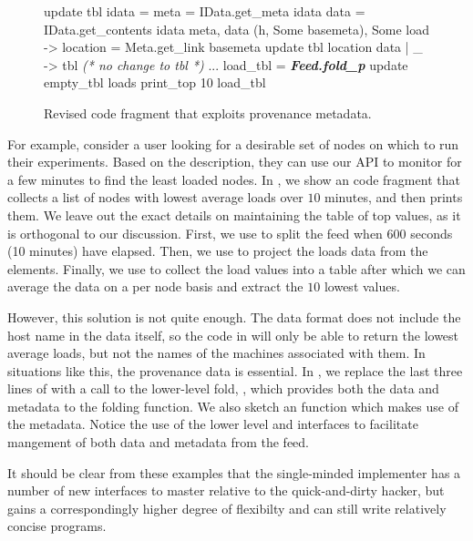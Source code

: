 \begin{figure}[tb]

\begin{codebox}
 update tbl idata =
   meta = IData.get_meta idata 
   data = IData.get_contents idata 
   meta, data  
    (h, Some basemeta), Some load ->
       location = Meta.get_link basemeta 
      update tbl location data
  | _ -> tbl \textit{ (* no change to tbl *)}
 ...
 load_tbl = \textit{\textbf{Feed.fold_p}} update empty_tbl loads
 print_top 10 load_tbl
\end{codebox}
  \caption{Revised code fragment that exploits provenance metadata. }
\label{fig:sample-loads-prov}
\end{figure}

For example, consider a \planetlab user looking for a desirable set of
nodes on which to run their experiments. Based on the \comon
description, they can use our API to monitor \planetlab for a few
minutes to find the least loaded nodes. In ,
we show an \ocaml code fragment that collects a list of nodes with
lowest average loads over $10$ minutes, and then prints them. We leave
out the exact details on maintaining the table of top values, as it is
orthogonal to our discussion. First, we use  to
split the feed when 600 seconds (10 minutes) have elapsed. Then, we
use  to project the loads data from the\comon
elements. Finally, we use  to collect the load values
into a table after which we can average the data on a per node basis
and extract the $10$ lowest values.

However, this solution is not quite enough. The \comon data format
does not include the host name in the data itself, so the code in
 will only be able to return the lowest
average loads, but not the names of the machines associated with
them. In situations like this, the provenance data is essential.  In
, we replace the last three lines of
 with a call to the lower-level fold,
, which provides both the data and metadata to the folding
function. We also sketch an  function which makes use of 
the metadata.   Notice the use of the lower level  and
 interfaces to facilitate mangement of both data and 
metadata from the feed. 

It should be clear from these examples that the single-minded implementer
has a number of new interfaces to master relative to the quick-and-dirty
hacker, but gains a correspondingly higher degree of flexibilty and can
still write relatively concise programs.

